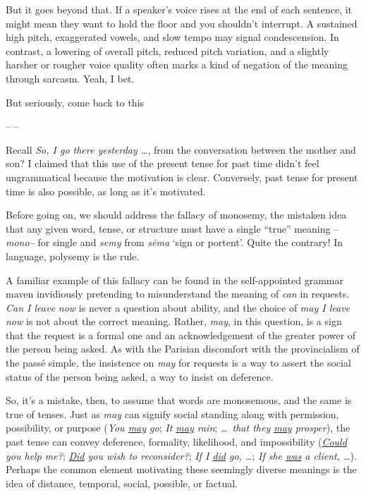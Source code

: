 But it goes beyond that. If a speaker's voice rises at the end of each sentence, it might mean they want to hold the floor and you shouldn't interrupt. A sustained high pitch, exaggerated vowels, and slow tempo may signal condescension. In contrast, a lowering of overall pitch, reduced pitch variation, and a slightly harsher or rougher voice quality often marks a kind of negation of the meaning through sarcasm. Yeah, I bet.

But seriously, \ob come back to this \cb

\begin{center}
    -- --
\end{center}

Recall \textit{So, I go there yesterday \dots}, from the conversation between the mother and son? I claimed that this use of the present tense for past time didn't feel ungrammatical because the motivation is clear. Conversely, past tense for present time is also possible, as long as it's motivated.

Before going on, we should address the fallacy of monosemy, the mistaken idea that any given word, tense, or structure must have a single ``true'' meaning -- \textit{mono--} for single and \textit{semy} from \textit{sēma} `sign or portent'. Quite the contrary! In language, polysemy is the rule.

A familiar example of this fallacy can be found in the self-appointed grammar maven invidiously pretending to misunderstand the meaning of \textit{can} in requests. \textit{Can I leave now} is never a question about ability, and the choice of \textit{may I leave now} is not about the correct meaning. Rather, \textit{may}, in this question, is a sign that the request is a formal one and an acknowledgement of the greater power of the person being asked. As with the Parisian discomfort with the provincialism of the passé simple, the insistence on \textit{may} for requests is a way to assert the social status of the person being asked, a way to insist on deference.

So, it's a mistake, then, to assume that words are monosemous, and the same is true of tenses. Just as \textit{may} can signify social standing along with permission, possibility, or purpose (\textit{You \uline{may} go}; \textit{It \uline{may} rain}; \textit{\dots~that they \uline{may} prosper}), the past tense can convey deference, formality, likelihood, and impossibility (\textit{\uline{Could} you help me?}; \textit{\uline{Did} you wish to reconsider?}; \textit{If I \uline{did} go, \dots}; \textit{If she \uline{was} a client, \dots}). Perhaps the common element motivating these seemingly diverse meanings is the idea of distance, temporal, social, possible, or factual.

